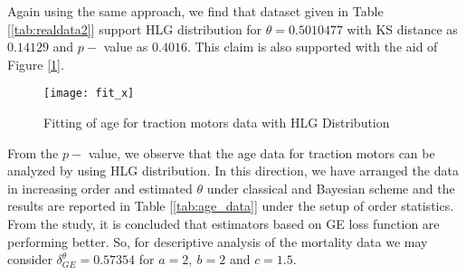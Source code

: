 \documentclass[11pt,a4paper]{article}
\numberwithin{equation}{section}
\begin{document}
	Again using the same approach, we find that dataset given in Table [\ref{tab:realdata2}] support HLG distribution for $\theta=0.5010477$ with KS distance as $0.14129$ and $p-$ value as $0.4016.$  This claim is also supported with the aid of Figure [\ref{fig:realdata2}].

	\begin{figure}

		\centering

		\texttt{[image: fit\_x]}

		\caption{Fitting of  age for traction motors data with HLG Distribution}

		\label{fig:realdata2}

	\end{figure}

	From the $p-$ value, we observe that the age data for traction motors can be analyzed by using HLG distribution. In this direction, we have arranged the data in increasing order and estimated $\theta$ under classical and Bayesian scheme and the results are reported in Table [\ref{tab:age_data}] under the setup of order statistics. From the study, it is concluded that estimators based on GE loss function are performing better. So, for descriptive analysis of the mortality data we may consider $\delta^\theta_{GE}=0.57354$ for $a=2,~b=2$ and $c=1.5.$

\end{document}
